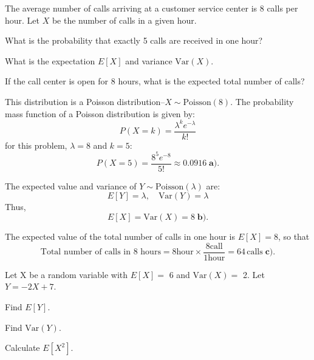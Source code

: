\documentclass[a4paper, 10pt]{article}
\begin{document}
\begin{problem}
The average number of calls arriving at a customer service center is 8 calls per hour.
Let \( X \) be the number of calls in a given hour.
\begin{subproblems}
    \item What is the probability that exactly 5 calls are received in one hour?
    \item What is the expectation \( E[X] \) and variance \( \text{Var}(X) \).
    \item If the call center is open for 8 hours, what is the expected total number of calls?
\end{subproblems}
\end{problem}

\begin{solution}
This distribution is a Poisson distribution--\( X \sim \text{Poisson}(8) \).
The probability mass function of a Poisson distribution is given by:
\[
    P(X = k) = \frac{\lambda^k e^{-\lambda}}{k!}
\]
for this problem, \( \lambda = 8 \) and \( k = 5 \):
\[
    P(X = 5) = \frac{8^5 e^{-8}}{5!} \approx \boxed{0.0916} \; \textbf{a).}
\]

The expected value and variance of \( Y \sim \text{Poisson}(\lambda) \) are:
\[
    E[Y] = \lambda, \quad \text{Var}(Y) = \lambda
\]
Thus,
\[
    \boxed{E[X] = \text{Var}(X) = 8} \; \textbf{b).}
\]

The expected value of the total number of calls in one hour is \( E[X] = 8 \), so that
\[
    \text{Total number of calls in 8 hours} = 8 \text{hour} \times \frac{8 \text{call}}{1 \text{hour}} = \boxed{64 \, \text{calls}} \; \textbf{c).}
\]
\end{solution}


\begin{problem}
Let X be a random variable with \( E[X] = \) 6 and \( \text{Var}(X) = \) 2.
Let \( Y = -2X + 7 \).
\begin{subproblems}
    \item Find \( E[Y] \).
    \item Find \( \text{Var}(Y) \).
    \item Calculate \( E[X^2] \).
\end{subproblems}
\end{problem}
\end{document}

